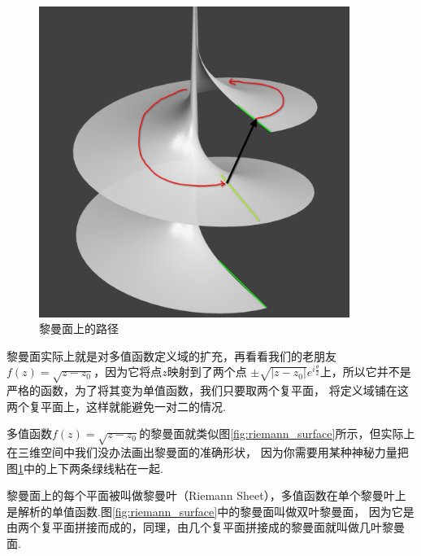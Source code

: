 \documentclass[lang=cn, titlestyle=display, scheme=chinese]{elegantbook}
\begin{document}
\begin{figure}[htbp]
\begin{minipage}[t]{0.48\textwidth}
                        \includegraphics[width=0.9\textwidth]{RiemannSurfacePainted.png}
                        \caption{黎曼面上的路径}
                        \label{fig:riemann_surface_painted}
                    \end{minipage}
                \end{figure}

                黎曼面实际上就是对多值函数定义域的扩充，再看看我们的老朋友$f(z) = \sqrt{z - z_0}$，因为它将点$z$映射到了两个点
                $\pm \sqrt{|z - z_0|}e^{i\frac{\theta}{2}}$上，所以它并不是严格的函数，为了将其变为单值函数，我们只要取两个复平面，
                将定义域铺在这两个复平面上，这样就能避免一对二的情况.

                多值函数$f(z) = \sqrt{z - z_0}$的黎曼面就类似图\ref{fig:riemann_surface}所示，但实际上在三维空间中我们没办法画出黎曼面的准确形状，
                因为你需要用某种神秘力量把图\ref{fig:riemann_surface_painted}中的上下两条绿线粘在一起.

                \begin{definition}
                    黎曼面上的每个平面被叫做黎曼叶（Riemann Sheet），多值函数在单个黎曼叶上是解析的单值函数.图\ref{fig:riemann_surface}中的黎曼面叫做双叶黎曼面，
                    因为它是由两个复平面拼接而成的，同理，由几个复平面拼接成的黎曼面就叫做几叶黎曼面.
                \end{definition}
\end{document}

